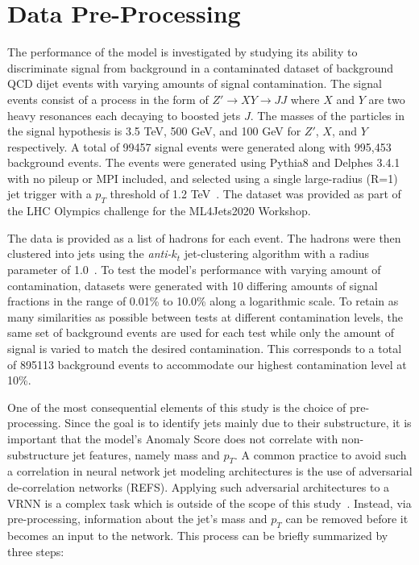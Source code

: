\documentclass[12pt, a4paper]{article}
\begin{document}

\section{Data Pre-Processing}


The performance of the model is investigated by studying its ability to discriminate signal from background in a contaminated dataset of background QCD dijet events with varying amounts of signal contamination. The signal events consist of a process in the form of $Z'\rightarrow XY \rightarrow JJ$ where $X$ and $Y$ are two heavy resonances each decaying to boosted jets $J$. The masses of the particles in the signal hypothesis is 3.5 TeV, 500 GeV, and 100 GeV for $Z'$, $X$, and $Y$ respectively. A total of 99457 signal events were generated along with 995,453 background events. The events were generated using {\sc Pythia8} and {\sc Delphes 3.4.1} with no pileup or MPI included, and selected using a single large-radius (R=1) jet trigger with a $p_T$ threshold of 1.2 TeV~\cite{dataset}. The dataset was provided as part of the LHC Olympics challenge for the ML4Jets2020 Workshop. 

The data is provided as a list of hadrons for each event. The hadrons were then clustered into jets using the \textit{anti-$k_{t}$} jet-clustering algorithm with a radius parameter of 1.0~\cite{Cacciari_2008}. To test the model's performance with varying amount of contamination, datasets were generated with 10 differing amounts of signal fractions in the range of 0.01\% to 10.0\% along a logarithmic scale. To retain as many similarities as possible between tests at different contamination levels, the same set of background events are used for each test while only the amount of signal is varied to match the desired contamination. This corresponds to a total of 895113 background events to accommodate our highest contamination level at 10\%.

One of the most consequential elements of this study is the choice of pre-processing. Since the goal is to identify jets mainly due to their substructure, it is important that the model's Anomaly Score does not correlate with non-substructure jet features, namely mass and $p_{T}$. A common practice to avoid such a correlation in neural network jet modeling architectures is the use of adversarial de-correlation networks (REFS). Applying such adversarial architectures to a VRNN is a complex task which is outside of the scope of this study~\cite{Purushotham2017VariationalRA}. Instead, via pre-processing, information about the jet's mass and $p_{T}$ can be removed before it becomes an input to the network. This process can be briefly summarized by three steps:
\end{document}
